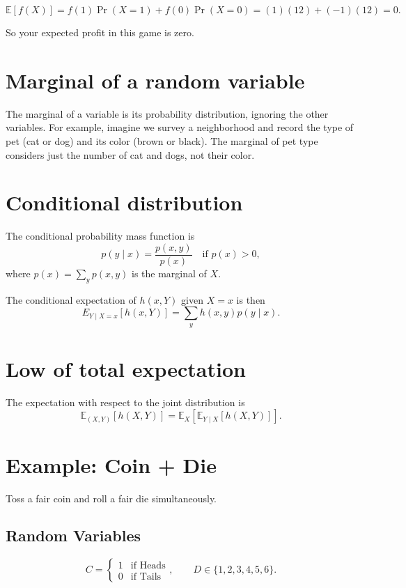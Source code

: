 \begin{equation*}
\mathbb{E}[f(X)]=f(1)\Pr(X=1)+f(0)\Pr(X=0) = (1)(12)+(-1)(12)=0.
\end{equation*}

So your expected profit in this game is zero.

\section{Marginal of a random variable}
The marginal of a variable is its probability distribution, ignoring
the other variables. For example, imagine we survey a neighborhood and
record the type of pet (cat or dog) and its color (brown or
black). The marginal of pet type considers just the number of cat and
dogs, not their color.

\section{Conditional distribution}

The conditional probability mass function is
$$ p(y \mid x) = \frac{p(x,y)}{p(x)} \quad \text{if } p(x) > 0, $$
where $p(x) = \sum_{y} p(x,y)$ is the marginal of $X$.

The conditional expectation of $h(x,Y)$ given $X=x$ is then
$$ E_{Y \mid X=x}[h(x,Y)] = \sum_{y} h(x,y) p(y \mid x). $$

\section{Low of total expectation}
The expectation with respect to the joint distribution is
\begin{equation}
  \mathbb{E}_{(X,Y)}[h(X,Y)]=\mathbb{E}_{X}[\mathbb{E}_{Y\mid X}[h(X,Y)]].
\end{equation}

\section*{Example: Coin + Die}

Toss a fair coin and roll a fair die simultaneously.

\subsection*{Random Variables}
\[
C = 
\begin{cases}
1 & \text{if Heads} \\
0 & \text{if Tails}
\end{cases}, 
\qquad
D \in \{1,2,3,4,5,6\}.
\]

